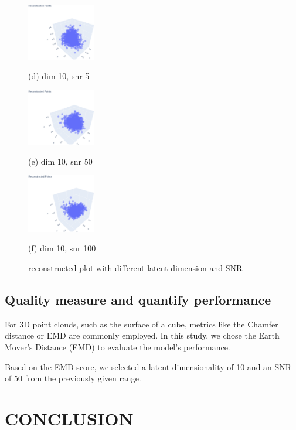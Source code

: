 \documentclass{article}
\begin{document}
\begin{figure}[htb]
  \begin{minipage}[b]{0.3\linewidth}
    \centering
    \includegraphics[width=3.0cm]{images/reconstructed_10_5}
    \centerline{(d) dim 10, snr 5}\medskip
  \end{minipage}
  \hfill
  \begin{minipage}[b]{0.3\linewidth}
    \centering
    \includegraphics[width=3.0cm]{images/reconstructed_10_50}
    \centerline{(e) dim 10, snr 50}\medskip
  \end{minipage}
  \begin{minipage}[b]{0.3\linewidth}
    \centering
    \includegraphics[width=3.0cm]{images/reconstructed_10_100}
    \centerline{(f) dim 10, snr 100}\medskip
  \end{minipage}
  
  \caption{reconstructed plot with different latent dimension and SNR}
  \label{fig:discuss}
\end{figure}

\subsection{Quality measure and quantify performance }
\label{ssec:measure}

For 3D point clouds, such as the surface of a cube, metrics like the Chamfer distance or EMD are commonly employed. In this study, we chose the Earth Mover's Distance (EMD) to evaluate the model's performance.

Based on the EMD score, we selected a latent dimensionality of 10 and an SNR of 50 from the previously given range.
\section{CONCLUSION}
\label{sec:conclusion}
\end{document}
